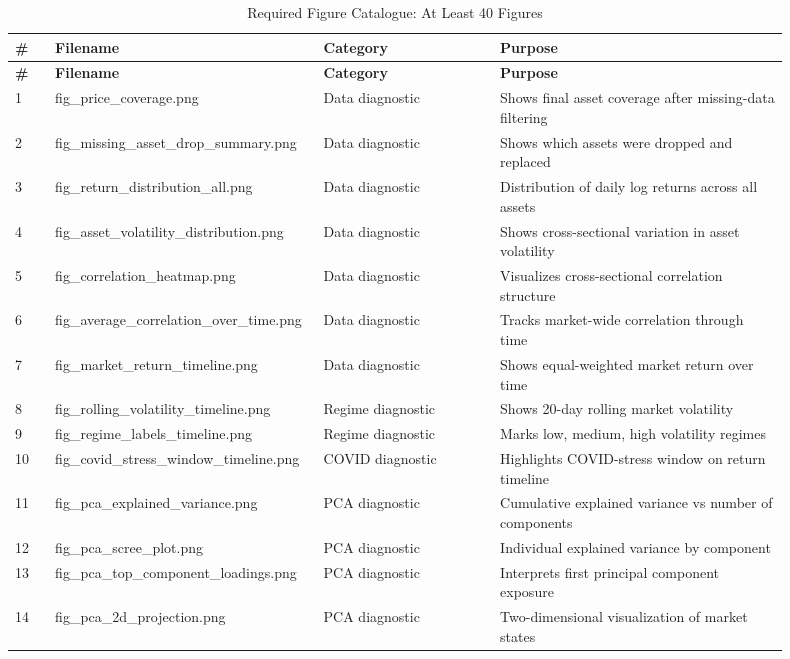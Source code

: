\documentclass[11pt]{article}
\begin{document}
\begin{longtable}{p{0.05\linewidth} p{0.27\linewidth} p{0.22\linewidth} p{0.36\linewidth}}
\caption{Required Figure Catalogue: At Least 40 Figures} \\
\toprule
\textbf{\#} & \textbf{Filename} & \textbf{Category} & \textbf{Purpose} \\
\midrule
\endfirsthead

\toprule
\textbf{\#} & \textbf{Filename} & \textbf{Category} & \textbf{Purpose} \\
\midrule
\endhead

1 & fig\_price\_coverage.png & Data diagnostic & Shows final asset coverage after missing-data filtering \\
2 & fig\_missing\_asset\_drop\_summary.png & Data diagnostic & Shows which assets were dropped and replaced \\
3 & fig\_return\_distribution\_all.png & Data diagnostic & Distribution of daily log returns across all assets \\
4 & fig\_asset\_volatility\_distribution.png & Data diagnostic & Shows cross-sectional variation in asset volatility \\
5 & fig\_correlation\_heatmap.png & Data diagnostic & Visualizes cross-sectional correlation structure \\
6 & fig\_average\_correlation\_over\_time.png & Data diagnostic & Tracks market-wide correlation through time \\
7 & fig\_market\_return\_timeline.png & Data diagnostic & Shows equal-weighted market return over time \\
8 & fig\_rolling\_volatility\_timeline.png & Regime diagnostic & Shows 20-day rolling market volatility \\
9 & fig\_regime\_labels\_timeline.png & Regime diagnostic & Marks low, medium, high volatility regimes \\
10 & fig\_covid\_stress\_window\_timeline.png & COVID diagnostic & Highlights COVID-stress window on return timeline \\
11 & fig\_pca\_explained\_variance.png & PCA diagnostic & Cumulative explained variance vs number of components \\
12 & fig\_pca\_scree\_plot.png & PCA diagnostic & Individual explained variance by component \\
13 & fig\_pca\_top\_component\_loadings.png & PCA diagnostic & Interprets first principal component exposure \\
14 & fig\_pca\_2d\_projection.png & PCA diagnostic & Two-dimensional visualization of market states \\

\end{longtable}
\end{document}

